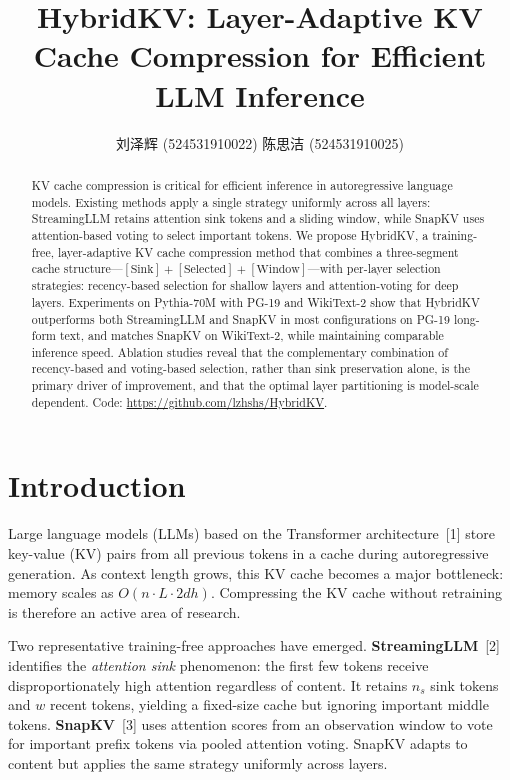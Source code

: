\documentclass{article}
\title{HybridKV: Layer-Adaptive KV Cache Compression for Efficient LLM Inference}
\author{%
  刘泽辉 (524531910022) \And 陈思洁 (524531910025)
}
\begin{document}
\maketitle
\thispagestyle{plain}

\begin{abstract}
KV cache compression is critical for efficient inference in autoregressive language models. Existing methods apply a single strategy uniformly across all layers: StreamingLLM retains attention sink tokens and a sliding window, while SnapKV uses attention-based voting to select important tokens. We propose HybridKV, a training-free, layer-adaptive KV cache compression method that combines a three-segment cache structure---$[\text{Sink}] + [\text{Selected}] + [\text{Window}]$---with per-layer selection strategies: recency-based selection for shallow layers and attention-voting for deep layers. Experiments on Pythia-70M with PG-19 and WikiText-2 show that HybridKV outperforms both StreamingLLM and SnapKV in most configurations on PG-19 long-form text, and matches SnapKV on WikiText-2, while maintaining comparable inference speed. Ablation studies reveal that the complementary combination of recency-based and voting-based selection, rather than sink preservation alone, is the primary driver of improvement, and that the optimal layer partitioning is model-scale dependent.
Code: \url{https://github.com/lzhshs/HybridKV}.
\end{abstract}

\section{Introduction}

Large language models (LLMs) based on the Transformer architecture~[1] store key-value (KV) pairs from all previous tokens in a cache during autoregressive generation. As context length grows, this KV cache becomes a major bottleneck: memory scales as $O(n \cdot L \cdot 2dh)$. Compressing the KV cache without retraining is therefore an active area of research.

Two representative training-free approaches have emerged. \textbf{StreamingLLM}~[2] identifies the \emph{attention sink} phenomenon: the first few tokens receive disproportionately high attention regardless of content. It retains $n_s$ sink tokens and $w$ recent tokens, yielding a fixed-size cache but ignoring important middle tokens. \textbf{SnapKV}~[3] uses attention scores from an observation window to vote for important prefix tokens via pooled attention voting. SnapKV adapts to content but applies the same strategy uniformly across layers.
\end{document}
